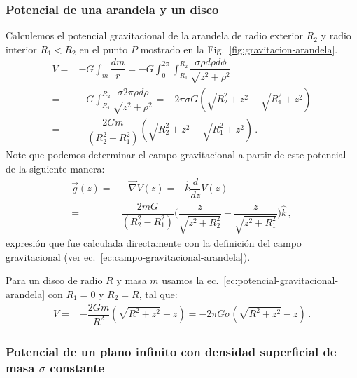 \subsubsection{Potencial de una arandela y un disco}
Calculemos el potencial gravitacional de la arandela de radio exterior $R_2$ y radio interior $R_1<R_2$ en el punto $P$ mostrado en la Fig.~\ref{fig:gravitacion-arandela}.
\begin{align}
V=& -G\int_m \dfrac{dm}{r} = -G\int_0^{2\pi}\int_{R_1}^{R_2}\dfrac{\sigma \rho d\rho d\phi}{\sqrt{z^2+\rho^2}}\nonumber\\
=& -G\int_{R_1}^{R_2}\dfrac{\sigma 2\pi\rho d\rho }{\sqrt{z^2+\rho^2}}=-2\pi\sigma G\left(\sqrt{R_2^2+z^2} -\sqrt{R_1^2+z^2}\right)
\nonumber\\
=& -\dfrac{2G m}{(R_2^2-R_1^2)} \left(\sqrt{R_2^2+z^2} -\sqrt{R_1^2+z^2}\right)\,.
\label{ec:potencial-gravitacional-arandela}
\end{align}
Note que podemos determinar el campo gravitacional a partir de este potencial de la siguiente manera:
\begin{align}
\vec{g}(z)=&-\vec{\nabla}V(z)=-\hat{k}\dfrac{d}{dz}V(z)\nonumber\\
=&\dfrac{2mG}{(R_2^2-R_1^2)} \Bigg(\dfrac{z}{\sqrt{z^2+R_2^2} } - \dfrac{z}{\sqrt{z^2+R_1^2} }  \Bigg)\hat{k}\,,
\end{align}
expresión que fue calculada directamente con la definición del campo gravitacional (ver ec.~\ref{ec:campo-gravitacional-arandela}).

Para un disco de radio $R$ y masa $m$ usamos la ec.~\ref{ec:potencial-gravitacional-arandela} con $R_1=0$ y $R_2=R$, tal que:
\begin{align}
V=& -\dfrac{2G m}{R^2} \left(\sqrt{R^2+z^2} -z\right)=-2\pi G \sigma \left(\sqrt{R^2+z^2} -z\right)\,.
\label{ec:potencial-gravitacinal-disco}
\end{align}



\subsubsection{Potencial de un plano infinito con densidad superficial de masa $\sigma$ constante}

